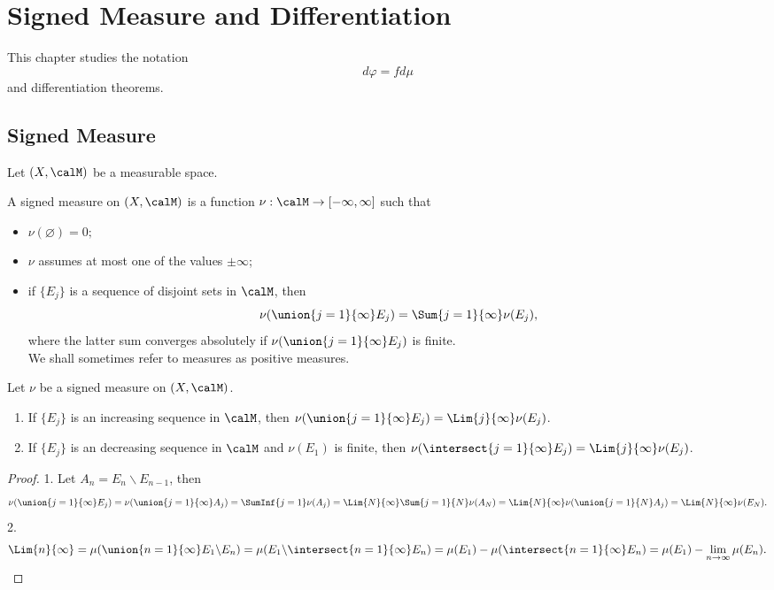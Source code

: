 \chapter{Signed Measure and Differentiation}
This chapter studies the notation 
$$d\varphi = fd\mu$$
and differentiation theorems.

\section{Signed Measure}
Let $(X, \calM)$ be a measurable space. 
\begin{definition}
    A signed measure on $(X, \calM)$ is a function $\nu: \calM \to [-\infty, \infty]$ such that 
    \begin{itemize}
        \item $\nu(\varnothing) = 0;$
        \item $\nu$ assumes at most one of the values $\pm \infty$;
        \item if $\{E_j\}$ is a sequence of disjoint sets in $\calM$, then 
        $$\nu(\union{j=1}{\infty}E_j) = \Sum{j=1}{\infty} \nu(E_j),$$
        where the latter sum converges absolutely if $\nu(\union{j=1}{\infty}E_j)$ is finite. \\
        We shall sometimes refer to measures as positive measures.
    \end{itemize}
\end{definition}
\begin{proposition}
    Let $\nu$ be a signed measure on $(X, \calM)$.
    \begin{enumerate}
        \item If $\{E_j\}$ is an increasing sequence in $\calM$, then 
        $\nu(\union{j=1}{\infty}E_j) = \Lim{j}{\infty}\nu(E_j)$. 
        \item If $\{E_j\}$ is an decreasing sequence in $\calM$ and $\nu(E_1)$ is finite, then $\nu(\intersect{j=1}{\infty}E_j) = \Lim{j}{\infty}\nu(E_j)$. 
    \end{enumerate}
\end{proposition}
\begin{proof}
    1. Let $A_n = E_n \backslash E_{n-1}$, then 
    $$\nu(\union{j=1}{\infty}E_j)=\nu(\union{j=1}{\infty}A_j)
    = \SumInf{j=1}\nu(A_j) = \Lim{N}{\infty}\Sum{j=1}{N}\nu(A_N) = \Lim{N}{\infty} \nu(\union{j=1}{N}A_j) = \Lim{N}{\infty}\nu(E_N).$$
    2. \begin{align*}
        \Lim{n}{\infty} = \mu(\union{n=1}{\infty}E_1 \backslash E_n)
        = \mu(E_1 \backslash \intersect{n=1}{\infty}E_n)
        = \mu(E_1) - \mu(\intersect{n=1}{\infty}E_n)
        = \mu(E_1) - \lim_{n \to \infty}\mu(E_n).
    \end{align*}
\end{proof}
